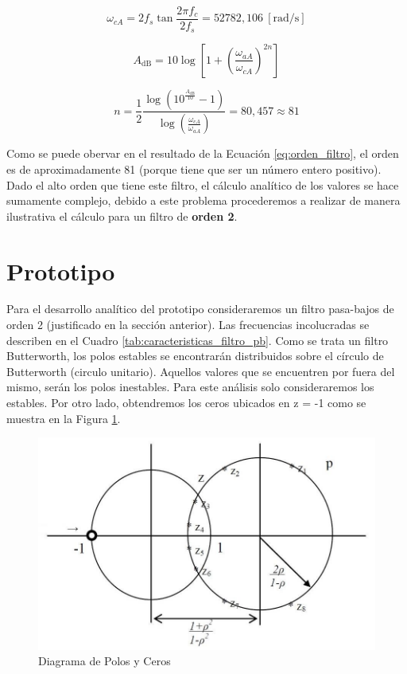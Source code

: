 \begin{equation}
  \omega_{cA} = 2 f_s \tan \frac{2\pi f_c}{2f_s} = 52782,106\ \mathrm{[rad / s]}
  \label{eq:omega_c}
\end{equation}

\begin{equation}
  A_\mathrm{dB} = 10 \log \left[1 + \left(\frac{\omega_{aA}}{\omega_{cA}}\right)^{2n}\right]
  \label{eq:atenuacion_db}
\end{equation}

\begin{equation}
  n = \frac{1}{2} \frac{\log \left(10^{\frac{A_{\mathrm{dB}}}{10}}-1 \right)}{\log \left( \frac{\omega_{cA}}{\omega_{aA}} \right)} = 80,457 \approx 81
  \label{eq:orden_filtro}
\end{equation}

Como se puede obervar en el resultado de la Ecuación \ref{eq:orden_filtro}, el orden es de aproximadamente 81 (porque tiene que ser un número entero positivo). Dado el alto orden que tiene este filtro, el cálculo analítico de los valores se hace sumamente complejo, debido a este problema procederemos a realizar de manera ilustrativa el cálculo para un filtro de \textbf{orden 2}.

\section{Prototipo}
Para el desarrollo analítico del prototipo consideraremos un filtro pasa-bajos de orden 2 (justificado en la sección anterior). Las frecuencias incolucradas se describen en el Cuadro \ref{tab:caracteristicas_filtro_pb}. Como se trata un filtro Butterworth, los polos estables se encontrarán distribuidos sobre el círculo de Butterworth (circulo unitario). Aquellos valores que se encuentren por fuera del mismo, serán los polos inestables. Para este análisis solo consideraremos los estables. Por otro lado, obtendremos los ceros ubicados en z = -1 como se muestra en la Figura \ref{fig:circulo_butterworth}.

\begin{figure}[ht]
  \centering
  \includegraphics[width=400pt]{images/circulo_butterworth.png}
  \caption{Diagrama de Polos y Ceros}
  \label{fig:circulo_butterworth}
\end{figure}

